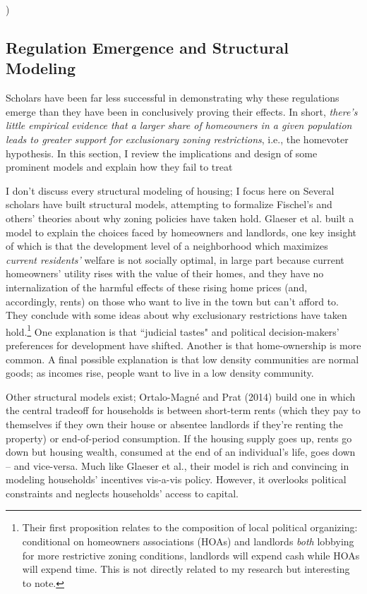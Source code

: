 )\documentclass{article}[11pt]
\begin{document}
	\subsection{Regulation Emergence and Structural Modeling}
Scholars have been far less successful in demonstrating why these regulations emerge than they have been in conclusively proving their effects. In short, \textit{there's little empirical evidence that a larger share of homeowners in a given population leads to greater support for exclusionary zoning restrictions}, i.e., the homevoter hypothesis. In this section, I review the implications and design of some prominent models and explain how they fail to treat 

I don't discuss every structural modeling of housing; I focus here on Several scholars have built structural models, attempting to formalize Fischel's and others' theories about why zoning policies have taken hold. Glaeser et al. built a model to explain the choices faced by homeowners and landlords, one key insight of which is that the development level of a neighborhood which maximizes \textit{current residents'} welfare is not socially optimal, in large part because current homeowners' utility rises with the value of their homes, and they have no internalization of the harmful effects of these rising home prices (and, accordingly, rents) on those who want to live in the town but can't afford to. \citep{glaeser2005} They conclude with some ideas about why exclusionary restrictions have taken hold.\footnote{Their first proposition relates to the composition of local political organizing: conditional on homeowners associations (HOAs) and landlords \textit{both} lobbying for more restrictive zoning conditions, landlords will expend cash while HOAs will expend time. This is not directly related to my research but interesting to note.} One explanation is that ``judicial tastes" and political decision-makers' preferences for development have shifted. Another is that home-ownership is more common. A final possible explanation is that low density communities are normal goods; as incomes rise, people want to live in a low density community. 

Other structural models exist; Ortalo-Magné and Prat (2014) build one in which the central tradeoff for households is between short-term rents (which they pay to themselves if they own their house or absentee landlords if they're renting the property) or end-of-period consumption. \citep{ortalo2014political} If the housing supply goes up, rents go down but housing wealth, consumed at the end of an individual's life, goes down -- and vice-versa. Much like Glaeser et al., their model is rich and convincing in modeling households' incentives vis-a-vis policy. However, it overlooks political constraints and neglects households' access to capital. 
\end{document}

